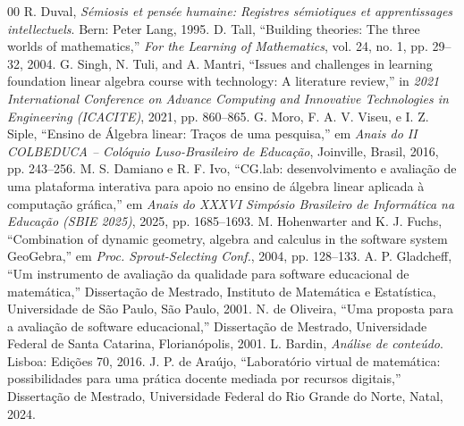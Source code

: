 \documentclass[conference]{IEEEtran}
\begin{document}
\begin{thebibliography}{00}
 R. Duval, \textit{Sémiosis et pensée humaine: Registres sémiotiques et apprentissages intellectuels}. Bern: Peter Lang, 1995.
 D. Tall, ``Building theories: The three worlds of mathematics,'' \textit{For the Learning of Mathematics}, vol. 24, no. 1, pp. 29--32, 2004.
 G. Singh, N. Tuli, and A. Mantri, ``Issues and challenges in learning foundation linear algebra course with technology: A literature review,'' in \textit{2021 International Conference on Advance Computing and Innovative Technologies in Engineering (ICACITE)}, 2021, pp. 860--865.
 G. Moro, F. A. V. Viseu, e I. Z. Siple, ``Ensino de Álgebra linear: Traços de uma pesquisa,'' em \textit{Anais do II COLBEDUCA -- Colóquio Luso-Brasileiro de Educação}, Joinville, Brasil, 2016, pp. 243--256.
 M. S. Damiano e R. F. Ivo, ``CG.lab: desenvolvimento e avaliação de uma plataforma interativa para apoio no ensino de álgebra linear aplicada à computação gráfica,'' em \textit{Anais do XXXVI Simpósio Brasileiro de Informática na Educação (SBIE 2025)}, 2025, pp. 1685--1693.
 M. Hohenwarter and K. J. Fuchs, ``Combination of dynamic geometry, algebra and calculus in the software system GeoGebra,'' em \textit{Proc. Sprout-Selecting Conf.}, 2004, pp. 128--133.
 A. P. Gladcheff, ``Um instrumento de avaliação da qualidade para software educacional de matemática,'' Dissertação de Mestrado, Instituto de Matemática e Estatística, Universidade de São Paulo, São Paulo, 2001.
 N. de Oliveira, ``Uma proposta para a avaliação de software educacional,'' Dissertação de Mestrado, Universidade Federal de Santa Catarina, Florianópolis, 2001.
 L. Bardin, \textit{Análise de conteúdo}. Lisboa: Edições 70, 2016.
 J. P. de Araújo, ``Laboratório virtual de matemática: possibilidades para uma prática docente mediada por recursos digitais,'' Dissertação de Mestrado, Universidade Federal do Rio Grande do Norte, Natal, 2024.
\end{thebibliography}
\end{document}
